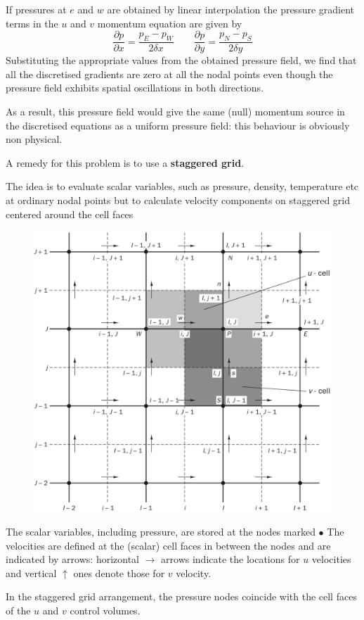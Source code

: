 \documentclass[a4paper, 15pt]{article}
\begin{document}
If
pressures at $e$ and $w$ are obtained by linear interpolation the pressure gradient terms in the $u$
and $v$ momentum equation are given by
\[\dfrac{\partial p}{\partial x} = \dfrac{p_E-p_W}{2\delta x} \qquad \dfrac{\partial p}{\partial y} = \dfrac{p_N - p_S}{2\delta y}\]
Substituting
the appropriate values from the obtained pressure field, we
find that all the discretised gradients are zero at all the nodal points even though the pressure
field exhibits spatial oscillations in both directions. 

As
a result, this pressure field would give the same (null) momentum source in the discretised
equations as a uniform pressure field: this behaviour is obviously non physical. \newline 

A
remedy for this problem is to use a \textbf{staggered grid}. \newline 


\begin{tcolorbox}[colback=red!5!white,colframe=red!75!black,title=Take Home Message]
	The
idea is to evaluate scalar variables, such as pressure, density, temperature etc at ordinary
nodal points but to calculate velocity components on staggered grid centered around the cell
faces
\end{tcolorbox}
\begin{figure}[H]
	\centering
	\includegraphics[width=0.5\linewidth]{fig/screenshot021}
	\label{fig:screenshot021}
\end{figure}
The
scalar variables, including pressure, are stored at the nodes marked $\bullet$ The velocities are
defined at the (scalar) cell faces in between the nodes and are indicated by arrows: horizontal $\rightarrow$
arrows indicate the locations for $u$ velocities and vertical $\uparrow$ ones denote those for $v$
velocity. \newline 

In
the staggered grid arrangement, the pressure nodes coincide with the cell faces of the $u$ and
$v$ control volumes. 
\end{document}
